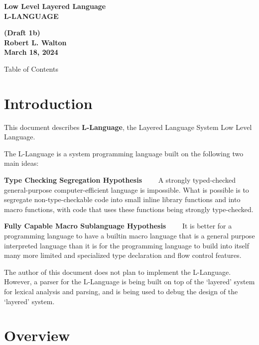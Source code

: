 \documentclass[12pt]{article}
\makeatletter
\renewcommand\tableofcontents{%
    \begin{list}{}%
	     {\setlength{\itemsep}{0in}%
	      \setlength{\topsep}{0in}%
	      \setlength{\parsep}{1ex}%
	      \setlength{\labelwidth}{0in}%
	      \setlength{\baselineskip}{1.5ex}%
	      \setlength{\leftmargin}{0.4in}%
	      \setlength{\rightmargin}{0.4in}}%
    \item\@starttoc{toc}%
    \end{list}}
\newcommand{\key}[1]{{\rm \bfseries #1}}
\newenvironment{indpar}[1][0.3in]%
	{\begin{list}{}%
		     {\setlength{\itemsep}{0in}%
		      \setlength{\topsep}{0in}%
		      \setlength{\parsep}{1ex}%
		      \setlength{\labelwidth}{#1}%
		      \setlength{\leftmargin}{#1}%
		      \addtolength{\leftmargin}{\labelsep}}%
	 \item}%
	{\end{list}}
\makeatother
\begin{document}
        
\begin{center}
\Large \bf
Low Level Layered Language\\[0.5ex]
\huge \bf
L-LANGUAGE
\end{center}
\begin{center}
\large \bf
(Draft 1b)
\\[0.5ex]
Robert L. Walton\\
March 18, 2024

\bigskip
 
Table of Contents
\end{center}

\bigskip

\tableofcontents 

\newpage

\section{Introduction}

This document describes \key{L-Language}, the Layered Language
System Low Level Language.

The L-Language is a system programming language built on the
following two main ideas:

\begin{indpar}

\key{Type Checking Segregation Hypothesis}~~~~ A strongly typed-checked
general-purpose computer-efficient language is impossible.
What is possible is
to segregate non-type-checkable code into small inline
library functions and into macro functions,
with code that uses these functions being
strongly type-checked.

\key{Fully Capable Macro Sublanguage Hypothesis}~~~~ It is better for
a programming language to have a builtin macro language that
is a general purpose interpreted language than it is for the
programming language to build into itself
many more limited and specialized type declaration and
flow control features.

\end{indpar}

The author of this document does not plan to implement the L-Language.
However, a parser for the L-Language is being built on top of the
`layered' system for lexical analysis and parsing, and is being used
to debug the design of the `layered' system.

\section{Overview}
\end{document}

